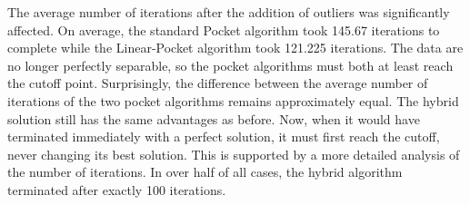 \documentclass[12pt]{article}
\begin{document}
\begin{description}
\begin{doublespace}
The average number of iterations after the addition of outliers was significantly affected. On average, the standard Pocket algorithm took 145.67 iterations to complete while the Linear-Pocket algorithm took 121.225
iterations. The data are no longer perfectly separable, so the pocket algorithms must both at least reach the cutoff point. Surprisingly, the difference between the average number of iterations of the two pocket algorithms remains approximately equal. The hybrid solution still has the same advantages as before. Now, when it would have terminated immediately with a perfect solution, it must first reach the cutoff, never changing its best solution. This is supported by a more detailed analysis of the number of iterations. In over half of all cases, the hybrid algorithm terminated after exactly 100 iterations.




\end{doublespace}
\end{description}
\end{document}
